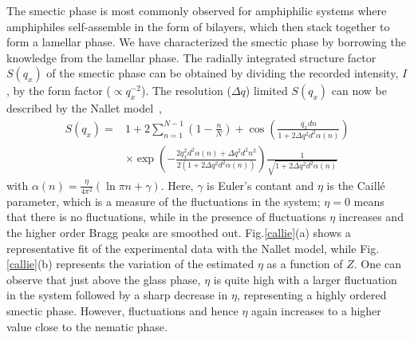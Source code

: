 \documentclass[aps,prl,preprint,superscriptaddress]{revtex4-1}
\begin{document}
The smectic phase is most commonly observed for amphiphilic systems where amphiphiles self-assemble in the form of bilayers, which then stack together to form a lamellar phase. We have characterized the smectic phase by borrowing the knowledge from the lamellar phase. The radially integrated structure factor $S(q_x)$ of the smectic phase can be obtained by dividing the recorded intensity, $I$, by the form factor ($\propto q_x^{-2}$). The resolution ($\Delta q$) limited $S(q_x)$ can now be described by the Nallet model~\cite{nallet1993modelling}, 
\begin{equation}
\label{eq1:}
\begin{split}
S(q_x) = &1+2\sum_{n=1}^{N-1} (1-\frac{n}{N}) +\cos(\frac{q_x d n}{1+2\Delta q^2 d^2 \alpha(n)})\\
&\times\exp(-\frac{2q_x^2 d^2\alpha(n)+\Delta q^2 d^2 n^2}{2(1+2\Delta q^2 d^2 \alpha(n))})\frac{1}{\sqrt{1+2\Delta q^2 d^2 \alpha (n)}}
\end{split}
\end{equation}
\noindent with $\alpha(n)=\frac{\eta}{4\pi^2}(\ln \pi n + \gamma)$. Here, $\gamma$ is Euler's contant and $\eta$ is the Caill\'{e} parameter, which is a measure of the fluctuations in the system; $\eta=0$ means that there is no fluctuations, while in the presence of fluctuations $\eta$ increases and the higher order Bragg peaks are smoothed out. Fig.\ref{callie}(a) shows a representative fit of the experimental data with the Nallet model, while Fig.\ref{callie}(b) represents the variation of the estimated $\eta$ as a function of $Z$. One can observe that just above the glass phase, $\eta$ is quite high with a larger fluctuation in the system followed by a sharp decrease in $\eta$, representing a highly ordered smectic phase. However, fluctuations and hence $\eta$ again increases to a higher value close to the nematic phase.\par  
\end{document}
